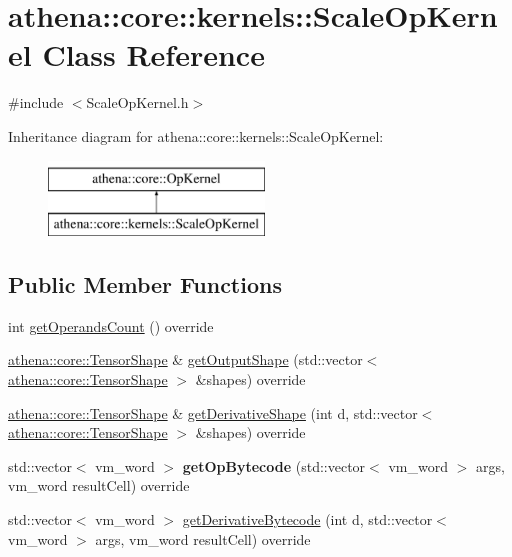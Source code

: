 \hypertarget{classathena_1_1core_1_1kernels_1_1_scale_op_kernel}{}\section{athena\+:\+:core\+:\+:kernels\+:\+:Scale\+Op\+Kernel Class Reference}
\label{classathena_1_1core_1_1kernels_1_1_scale_op_kernel}


{\ttfamily \#include $<$Scale\+Op\+Kernel.\+h$>$}

Inheritance diagram for athena\+:\+:core\+:\+:kernels\+:\+:Scale\+Op\+Kernel\+:\begin{figure}[H]
\begin{center}
\leavevmode
\includegraphics[height=2.000000cm]{dd/dba/classathena_1_1core_1_1kernels_1_1_scale_op_kernel}
\end{center}
\end{figure}
\subsection*{Public Member Functions}
\begin{DoxyCompactItemize}
\item 
int \mbox{\hyperlink{classathena_1_1core_1_1kernels_1_1_scale_op_kernel_a4f9e4fee100ed7f09840fa4b2d55f2bf}{get\+Operands\+Count}} () override
\item 
\mbox{\hyperlink{classathena_1_1core_1_1_tensor_shape}{athena\+::core\+::\+Tensor\+Shape}} \& \mbox{\hyperlink{classathena_1_1core_1_1kernels_1_1_scale_op_kernel_ad1791a60026e90c95f248202e1404a26}{get\+Output\+Shape}} (std\+::vector$<$ \mbox{\hyperlink{classathena_1_1core_1_1_tensor_shape}{athena\+::core\+::\+Tensor\+Shape}} $>$ \&shapes) override
\item 
\mbox{\hyperlink{classathena_1_1core_1_1_tensor_shape}{athena\+::core\+::\+Tensor\+Shape}} \& \mbox{\hyperlink{classathena_1_1core_1_1kernels_1_1_scale_op_kernel_ad7c63973c62e28c0ad3d854ce16debf1}{get\+Derivative\+Shape}} (int d, std\+::vector$<$ \mbox{\hyperlink{classathena_1_1core_1_1_tensor_shape}{athena\+::core\+::\+Tensor\+Shape}} $>$ \&shapes) override
\item 
\mbox{\label{classathena_1_1core_1_1kernels_1_1_scale_op_kernel_a1b088e9abe5556913123a7c9c8880ec0}} 
std\+::vector$<$ vm\+\_\+word $>$ {\bfseries get\+Op\+Bytecode} (std\+::vector$<$ vm\+\_\+word $>$ args, vm\+\_\+word result\+Cell) override
\item 
std\+::vector$<$ vm\+\_\+word $>$ \mbox{\hyperlink{classathena_1_1core_1_1kernels_1_1_scale_op_kernel_ad35869239968db73049161acbad05aab}{get\+Derivative\+Bytecode}} (int d, std\+::vector$<$ vm\+\_\+word $>$ args, vm\+\_\+word result\+Cell) override
\end{DoxyCompactItemize}
